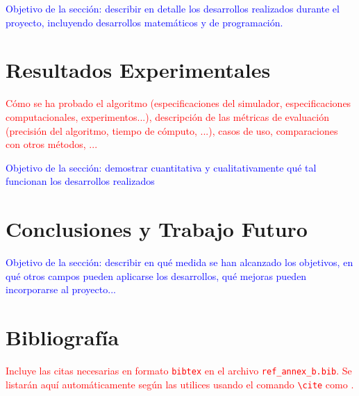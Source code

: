 \documentclass[12pt]{extarticle}
\numberwithin{equation}{section}
\begin{document}
\textcolor{blue}{Objetivo de la secci\'on: describir en detalle los desarrollos realizados durante el proyecto, incluyendo desarrollos matem\'aticos y de programaci\'on.}

\newpage

\section{Resultados Experimentales}\label{sec:results}

\textcolor{red}{C\'omo se ha probado el algoritmo (especificaciones del simulador, especificaciones computacionales, experimentos...), descripci\'on de las m\'etricas de evaluaci\'on (precisi\'on del algoritmo, tiempo de c\'omputo, ...), casos de uso, comparaciones con otros m\'etodos, ...}

\textcolor{blue}{Objetivo de la secci\'on: demostrar cuantitativa y cualitativamente qu\'e tal funcionan los desarrollos realizados}

\newpage

\section{Conclusiones y Trabajo Futuro}\label{sec:conclusion}
\textcolor{blue}{Objetivo de la secci\'on: describir en qu\'e medida se han alcanzado los objetivos, en qu\'e otros campos pueden aplicarse los desarrollos, qu\'e mejoras pueden incorporarse al proyecto...}

\newpage

\section{Bibliograf\'ia} \label{sec:bibliography}
\textcolor{red}{Incluye las citas necesarias en formato \texttt{bibtex} en el archivo \texttt{ref\_annex\_b.bib}. Se listar\'an aqu\'i autom\'aticamente seg\'un las utilices usando el comando \texttt{\textbackslash cite} como \cite{einstein1905}.} 
\end{document}
